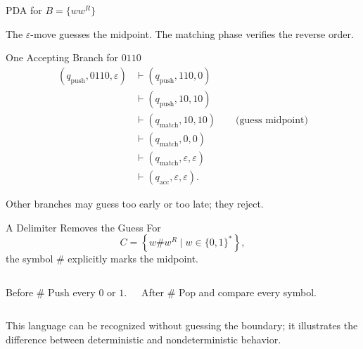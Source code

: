 \documentclass[aspectratio=169,10pt]{beamer}
\newcommand{\eps}{\varepsilon}
\newcommand{\turn}{\vdash}
\newcommand{\lang}[1]{\left\{#1\right\}}
\begin{document}
\begin{frame}{PDA for $B=\{ww^R\}$}
\centering
{}

\vspace{0.8em}
The $\eps$-move guesses the midpoint. The matching phase verifies the reverse order.
\end{frame}

\begin{frame}{One Accepting Branch for $0110$}
\begin{align*}
(q_{\mathrm{push}},0110,\eps)
&\turn(q_{\mathrm{push}},110,0)\\
&\turn(q_{\mathrm{push}},10,10)\\
&\turn(q_{\mathrm{match}},10,10)\qquad\text{(guess midpoint)}\\
&\turn(q_{\mathrm{match}},0,0)\\
&\turn(q_{\mathrm{match}},\eps,\eps)\\
&\turn(q_{\mathrm{acc}},\eps,\eps).
\end{align*}

Other branches may guess too early or too late; they reject.
\end{frame}

\begin{frame}{A Delimiter Removes the Guess}
For
\[
C=\lang{w\#w^R\mid w\in\{0,1\}^{*}},
\]
the symbol $\#$ explicitly marks the midpoint.

\vspace{0.8em}
\begin{columns}[T,onlytextwidth]
\begin{block}{Before $\#$}
Push every $0$ or $1$.
\end{block}

\begin{exampleblock}{After $\#$}
Pop and compare every symbol.
\end{exampleblock}
\end{columns}

\vspace{0.8em}
This language can be recognized without guessing the boundary; it illustrates the difference between deterministic and nondeterministic behavior.
\end{frame}
\end{document}
